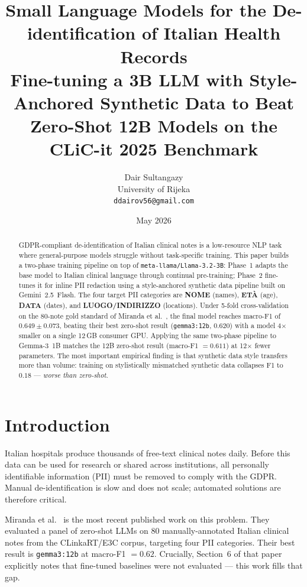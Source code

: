 \documentclass[11pt,a4paper]{article}
\title{\textbf{Small Language Models for the De-identification of Italian Health Records}\\[0.3em]
\large Fine-tuning a 3B LLM with Style-Anchored Synthetic Data to Beat\\
Zero-Shot 12B Models on the CLiC-it 2025 Benchmark}
\author{Dair Sultangazy\\
\small University of Rijeka\\
\small \texttt{ddairov56@gmail.com}}
\date{May 2026}
\begin{document}
\maketitle

\begin{abstract}
\noindent
GDPR-compliant de-identification of Italian clinical notes is a low-resource NLP task where general-purpose models struggle without task-specific training. This paper builds a two-phase training pipeline on top of \texttt{meta-llama/Llama-3.2-3B}: Phase~1 adapts the base model to Italian clinical language through continual pre-training; Phase~2 fine-tunes it for inline PII redaction using a style-anchored synthetic data pipeline built on Gemini~2.5~Flash. The four target PII categories are \textbf{NOME} (names), \textbf{ETÀ} (age), \textbf{DATA} (dates), and \textbf{LUOGO/INDIRIZZO} (locations). Under 5-fold cross-validation on the 80-note gold standard of Miranda et al.\ \cite{miranda2025mamma}, the final model reaches macro-F1 of $0.649 \pm 0.073$, beating their best zero-shot result (\texttt{gemma3:12b}, 0.620) with a model 4$\times$ smaller on a single 12\,GB consumer GPU. Applying the same two-phase pipeline to Gemma-3~1B matches the 12B zero-shot result (macro-F1 $= 0.611$) at 12$\times$ fewer parameters. The most important empirical finding is that synthetic data style transfers more than volume: training on stylistically mismatched synthetic data collapses F1 to $0.18$ — \textit{worse than zero-shot}.
\end{abstract}

\tableofcontents
\newpage

\section{Introduction}
\label{sec:intro}

Italian hospitals produce thousands of free-text clinical notes daily. Before this data can be used for research or shared across institutions, all personally identifiable information (PII) must be removed to comply with the GDPR. Manual de-identification is slow and does not scale; automated solutions are therefore critical.

Miranda et al.\ \cite{miranda2025mamma} is the most recent published work on this problem. They evaluated a panel of zero-shot LLMs on 80 manually-annotated Italian clinical notes from the CLinkaRT/E3C corpus, targeting four PII categories. Their best result is \texttt{gemma3:12b} at macro-F1 $= 0.62$. Crucially, Section~6 of that paper explicitly notes that fine-tuned baselines were not evaluated — this work fills that gap.
\end{document}
